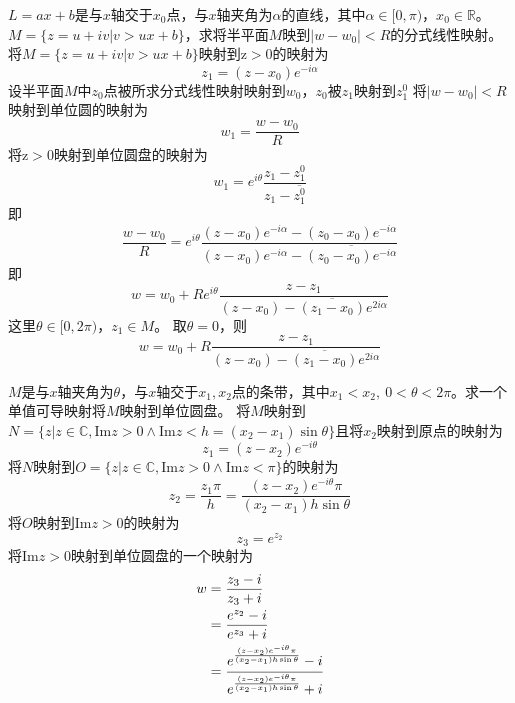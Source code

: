 \begin{homeworkProblem}
$L=ax+b$是与$x$轴交于$x_0$点，与$x$轴夹角为$\alpha$的直线，其中$\alpha\in[0,\pi)$，$x_0\in\mathbb{R}$。$M=\{z=u+iv|v>ux+b\}$，求将半平面$M$映到$|w-w_0|<R$的分式线性映射。\newline
\solution
将$M=\{z=u+iv|v>ux+b\}$映射到$\mathrm{z}>0$的映射为
\[
z_1 = (z-x_0)e^{-i\alpha}
\]
设半平面$M$中$z_0$点被所求分式线性映射映射到$w_0$，$z_0$被$z_1$映射到$z_1^0$\newline
将$|w-w_0|<R$映射到单位圆的映射为
\[
w_1 = \frac{w-w_0}{R}
\]
将$\mathrm{z}>0$映射到单位圆盘的映射为
\[
w_1 = e^{i\theta}\frac{z_1 - z_1^0}{z_1-\overline{z_1^0}}
\]
即
\[
\frac{w-w_0}{R} = e^{i\theta}\frac{(z-x_0)e^{-i\alpha} - (z_0-x_0)e^{-i\alpha}}
{(z-x_0)e^{-i\alpha} - \overline{(z_0-x_0)e^{-i\alpha}}}
\]
即
\[
w = w_0 + Re^{i\theta}\frac{z-z_1}{(z-x_0)-\overline{(z_1-x_0)}e^{2i\alpha}}
\]
这里$\theta\in[0,2\pi)$，$z_1\in M$。\newline
取$\theta=0$，则
\[
w = w_0 + R\frac{z-z_1}{(z-x_0)-\overline{(z_1-x_0)}e^{2i\alpha}}
\]
\end{homeworkProblem}

\begin{homeworkProblem}
    $M$是与$x$轴夹角为$\theta$，与$x$轴交于$x_1,x_2$点的条带，其中$x_1 < x_2,~0<\theta<2\pi$。求一个单值可导映射将$M$映射到单位圆盘。\newline
\solution
将$M$映射到$N = \{z|  z\in\mathbb{C},\mathrm{Im}z > 0 \land \mathrm{Im}z < h=(x_2-x_1)\sin\theta \}$且将$x_2$映射到原点的映射为
\[
z_1 = (z-x_2)e^{-i\theta}
\]
将$N$映射到$O = \{z|  z\in\mathbb{C},\mathrm{Im}z > 0 \land \mathrm{Im}z < \pi\}$的映射为
\[
z_2 = \frac{z_1\pi}{h} = \frac{(z-x_2)e^{-i\theta}\pi}{(x_2-x_1)h\sin\theta}
\]
将$O$映射到$\mathrm{Im}z>0$的映射为
\[
z_3 = e^{z_2}
\]
将$\mathrm{Im}z>0$映射到单位圆盘的一个映射为
\[\begin{split}
w &= \frac{z_3 - i}{z_3+i}\\
&= \frac{e^{z_2} - i}{e^{z_3} + i} \\
&= \cfrac{e^{\frac{(z-x_2)e^{-i\theta}\pi}{(x_2-x_1)h\sin\theta}}-i}{e^{\frac{(z-x_2)e^{-i\theta}\pi}{(x_2-x_1)h\sin\theta}}+i}
\end{split}\]
\end{homeworkProblem}

